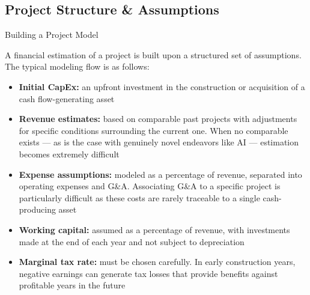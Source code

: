 \documentclass[10pt]{article}
\begin{document}
  \subsection{Project Structure \& Assumptions}

    \begin{core}{Building a Project Model}

      A financial estimation of a project is built upon a structured set of assumptions. The typical modeling flow is as follows:

      \begin{itemize}

        \item \textbf{Initial CapEx:} an upfront investment in the construction or acquisition of a cash flow-generating asset

        \item \textbf{Revenue estimates:} based on comparable past projects with adjustments for specific conditions surrounding the current one. When no comparable exists — as is the case with genuinely novel endeavors like AI — estimation becomes extremely difficult

        \item \textbf{Expense assumptions:} modeled as a percentage of revenue, separated into operating expenses and G\&A. Associating G\&A to a specific project is particularly difficult as these costs are rarely traceable to a single cash-producing asset

        \item \textbf{Working capital:} assumed as a percentage of revenue, with investments made at the end of each year and not subject to depreciation

        \item \textbf{Marginal tax rate:} must be chosen carefully. In early construction years, negative earnings can generate tax losses that provide benefits against profitable years in the future

      \end{itemize}


\end{core}
\end{document}

